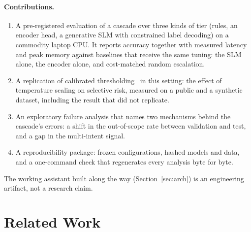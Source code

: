 \documentclass[11pt,a4paper]{article}
\begin{document}
\paragraph{Contributions.}
\begin{enumerate}
  \item A pre-registered evaluation of a cascade over three kinds of tier (rules, an encoder head, a generative SLM with
  constrained label decoding) on a commodity laptop CPU. It reports accuracy together with measured latency and peak
  memory against baselines that receive the same tuning: the SLM alone, the encoder alone, and cost-matched random
  escalation.
  \item A replication of calibrated thresholding~\citep{lu2024c3,zhang2026cauc} in this setting: the effect of
  temperature scaling on selective risk, measured on a public and a synthetic dataset, including the result that did not
  replicate.
  \item An exploratory failure analysis that names two mechanisms behind the cascade's errors: a shift in the
  out-of-scope rate between validation and test, and a gap in the multi-intent signal.
  \item A reproducibility package: frozen configurations, hashed models and data, and a one-command check that
  regenerates every analysis byte for byte.
\end{enumerate}
The working assistant built along the way (Section~\ref{sec:arch}) is an engineering artifact, not a research claim.

\section{Related Work}\label{sec:related}
\end{document}
